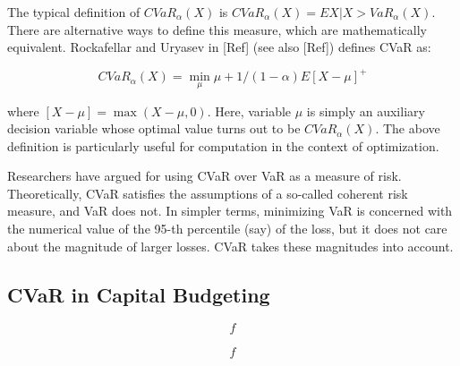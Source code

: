 The typical definition of $CVaR_\alpha (X)$ is $CVaR_\alpha (X) = E{X|X > VaR_\alpha (X)}$.
There are alternative ways to define this measure, which are mathematically equivalent.
Rockafellar and Uryasev in [Ref] (see also [Ref]) defines CVaR as:

\begin{equation}
CVaR_\alpha (X) = \min_\mu {\mu + 1/(1-\alpha) E[X-\mu]^+}
\end{equation}

where $[X-\mu] = \max (X - \mu, 0)$. Here, variable $\mu$ is simply an auxiliary decision
variable whose optimal value turns out to be $CVaR_\alpha (X)$. The above definition
is particularly useful for computation in the context of optimization.

Researchers have argued for using CVaR over VaR as a measure of risk. Theoretically,
CVaR satisfies the assumptions of a so-called coherent risk measure, and VaR does not.
In simpler terms, minimizing VaR is concerned with the numerical value of the 95-th
percentile (say) of the loss, but it does not care about the magnitude of larger losses.
CVaR takes these magnitudes into account.

\subsection{CVaR in Capital Budgeting}
\label{CVaRCapitalBudgeting}



\begin{equation}
f
\end{equation}

\begin{subequations}\label{WassersteinConstraints}
\begin{eqnarray}
f
\end{eqnarray}
\end{subequations}
